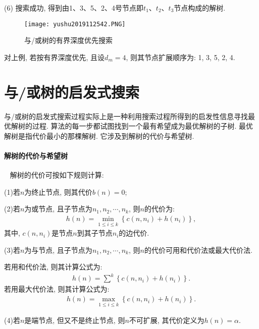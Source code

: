 (6) 搜索成功, 得到由1、3、5、2、4号节点即$t_1$、$t_2$、$t_3$节点构成的解树.
\begin{figure}[H]
\centering
\texttt{[image: yushu2019112542.PNG]}
\caption{与/或树的有界深度优先搜索}
\label{AI32fig42}
\end{figure}
对上例, 若按有界深度优先, 且设$d_m=4$, 则其节点扩展顺序为: 1, 3, 5, 2, 4.
\section{与/或树的启发式搜索}
与/或树的启发式搜索过程实际上是一种利用搜索过程所得到的启发性信息寻找最优解树的过程. 算法的每一步都试图找到一个最有希望成为最优解树的子树.
最优解树是指代价最小的那棵解树. 它涉及到解树的代价与希望树.
\paragraph{解树的代价与希望树}~{}
解树的代价可按如下规则计算:

(1)若$n$为终止节点, 则其代价$b(n)=0$;

(2)若$n$为或节点, 且子节点为$n_1, n_2, \cdots ,n_k$, 则$n$的代价为:
    \begin{align}
      h(n)=\min _{1 \leq i \leq k}\left\{c\left(n, n_{i}\right)+h\left(n_{i}\right)\right\},
    \end{align}
其中, $c(n, n_i )$是节点$n$到其子节点$n_i$的边代价.

(3)若$n$为与节点, 且子节点为$n_1, n_2,\cdots,n_k$, 则$n$的代价可用和代价法或最大代价法.

    若用和代价法, 则其计算公式为:
    \begin{align}
      h(n)=\sum^{k}\left\{c\left(n, n_{i}\right)+h\left(n_{i}\right)\right\}.
    \end{align}
        若用最大代价法, 则其计算公式为:
    \begin{align}
      h(n)=\max _{1 \leq i \leq k}\left\{c\left(n, n_{i}\right)+h\left(n_{i}\right)\right\}.
    \end{align}

(4)若$n$是端节点, 但又不是终止节点, 则$n$不可扩展, 其代价定义为$h(n)=\alpha$.

